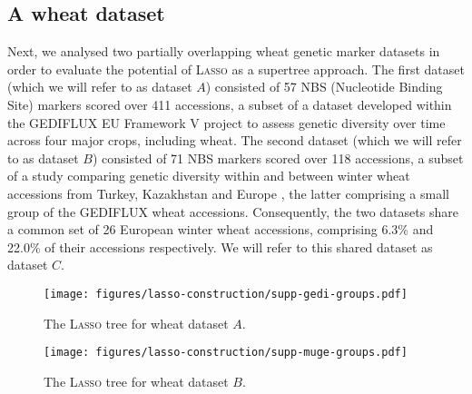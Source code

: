 \subsection{A wheat dataset}
\label{sec:wheat-dataset}

Next, we analysed two partially overlapping wheat genetic marker datasets in
order to evaluate the potential of \textsc{Lasso} as a supertree approach. The
first dataset (which we will refer to as dataset $A$) consisted of 57 NBS
(Nucleotide Binding Site) markers scored over 411 accessions, a subset of a
dataset developed within the GEDIFLUX EU Framework V project \cite{gediflux}
to assess genetic diversity over time across four major crops, including
wheat. The second dataset (which we will refer to as dataset $B$) consisted of
71 NBS markers scored over 118 accessions, a subset of a study comparing
genetic diversity within and between winter wheat accessions from Turkey,
Kazakhstan and Europe \cite{muge}, the latter comprising a small group of the
GEDIFLUX wheat accessions. Consequently, the two datasets share a common set
of 26 European winter wheat accessions, comprising 6.3\% and 22.0\% of their
accessions respectively. We will refer to this shared dataset as dataset $C$.

\begin{figure}
  \centering
  \texttt{[image: figures/lasso-construction/supp-gedi-groups.pdf]}
  \caption{The \textsc{Lasso} tree for wheat dataset $A$.}
  \label{fig:lasso-wheat-a}
\end{figure}

\begin{figure}
  \centering
  \texttt{[image: figures/lasso-construction/supp-muge-groups.pdf]}
  \caption{The \textsc{Lasso} tree for wheat dataset $B$.}
  \label{fig:lasso-wheat-b}
\end{figure} 

